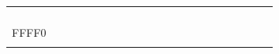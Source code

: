 \documentclass[xcolor=table, notheorems, hyperref={pdfpagelabels=false}]{beamer}
\begin{document}
\begin{frame}
\begin{minipage}[t]{120mm}
{\begin{tabular}{| c | c | c | c | c | c | c | c | c | c | c | c | c | c | c | c | c | c | c | c | c |}
                &   &   &   &   &   &   &   &   &   &   &   &   &   &   &   &     \\
\hline
                &   &   &   &   &   &   &   &   &   &   &   &   &   &   &   &     \\
                &   &   &   &   &   &   &   &   &   &   &   &   &   &   &   &     \\
                &   &   &   &   &   &   &   &   &   &   &   &   &   &   &   &     \\
\hline
                &   &   &   &   &   &   &   &   &   &   &   &   &   &   &   &     \\
         FFFF0  &   &   &   &   &   &   &   &   &   &   &   &   &   &   &   &     \\
                &   &   &   &   &   &   &   &   &   &   &   &   &   &   &   &     \\
\hline
\end{tabular}}
\end{minipage}
\\[2mm]
\end{frame}

\end{document}
